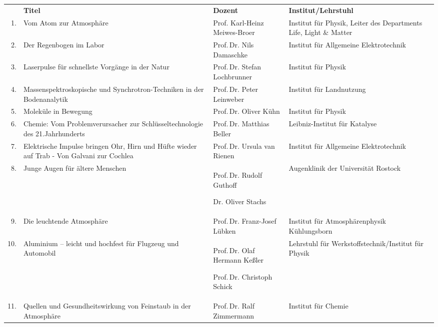 \begin{longtable}{rXp{5cm}p{4cm}}
   & \centering\textbf{Titel} & \centering\textbf{Dozent} &
  \textbf{Institut/Lehrstuhl}\\
  1. & Vom Atom zur Atmosphäre & Prof. Karl-Heinz Meiwes-Broer & Institut für
  Physik, Leiter des Departments Life, Light \& Matter\\

  2. & Der Regenbogen im Labor & Prof.\,Dr. Nils Damaschke & Institut für
  Allgemeine Elektrotechnik\\

  3. & Laserpulse für schnellste Vorgänge in der Natur & Prof.\,Dr. Stefan
  Lochbrunner & Institut für Physik\\

  4. & Massenspektroskopische und Synchrotron-Techniken in der Bodenanalytik &
  Prof.\,Dr. Peter Leinweber & Institut für Landnutzung\\

  5. & Moleküle in Bewegung & Prof.\,Dr. Oliver Kühn & Institut für Physik\\

  6. & Chemie: Vom Problemverursacher zur Schlüsseltechnologie des
  21.Jahrhunderts & Prof.\,Dr. Matthias Beller & Leibniz-Institut für Katalyse\\

  7. & Elektrische Impulse bringen Ohr, Hirn und Hüfte wieder auf Trab - Von
  Galvani zur Cochlea & Prof.\,Dr. Ursula van Rienen & Institut für Allgemeine
  Elektrotechnik\\

  8. & Junge Augen für ältere Menschen & Prof.\,Dr. Rudolf Guthoff

  Dr. Oliver Stachs & Augenklinik der Universität Rostock\\

  9. & Die leuchtende Atmosphäre & Prof.\,Dr. Franz-Josef Lübken & Institut für
  Atmosphärenphysik Kühlungsborn\\

  10. & Aluminium -- leicht und hochfest für Flugzeug und Automobil & Prof.\,Dr.
  Olaf Hermann Keßler

  Prof.\,Dr. Christoph Schick & Lehrstuhl für Werkstoffstechnik/Institut für
  Physik\\

  11. & Quellen und Gesundheitswirkung von Feinstaub in der Atmosphäre &
  Prof.\,Dr. Ralf Zimmermann & Institut für Chemie\\
\end{longtable}
\label{tbl:LLMVortragsliste}
